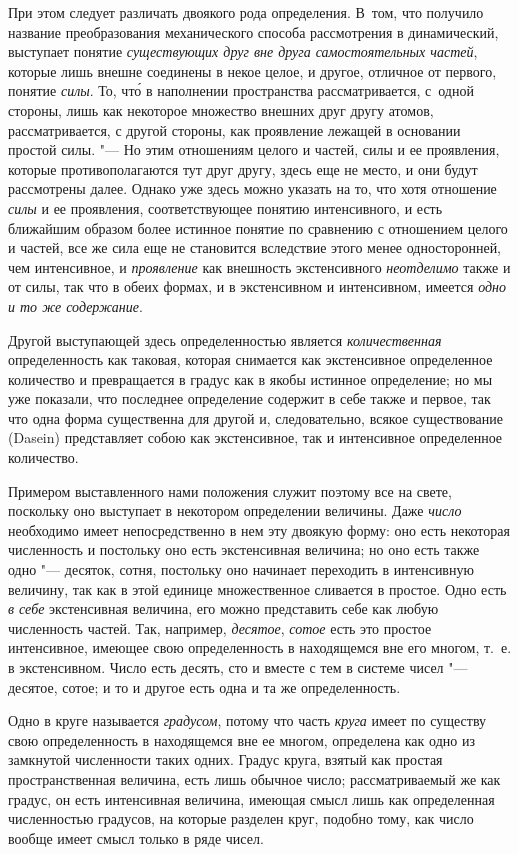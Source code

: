 При этом следует различать двоякого рода определения. В~том, что получило
название преобразования механического способа рассмотрения в динамический,
выступает понятие {\em существующих друг вне друга самостоятельных частей},
которые лишь внешне соединены в некое целое, и другое, отличное от первого,
понятие {\em силы}. То, чт\'{о} в наполнении пространства рассматривается,
с~одной стороны, лишь как некоторое множество внешних друг другу атомов,
рассматривается, с другой стороны, как проявление лежащей в основании простой
силы. "--- Но этим отношениям целого и частей, силы и ее проявления, которые
противополагаются тут друг другу, здесь еще не место, и они будут рассмотрены
далее. Однако уже здесь можно указать на то, что хотя отношение {\em силы} и ее
проявления, соответствующее понятию интенсивного, и есть ближайшим образом
более истинное понятие по сравнению с отношением целого и частей, все же сила
еще не становится вследствие этого менее односторонней, чем интенсивное, и
{\em проявление} как внешность экстенсивного {\em неотделимо} также и от силы,
так что в обеих формах, и в экстенсивном и интенсивном, имеется
{\em одно и то же содержание}.

Другой выступающей здесь определенностью является {\em количественная}
определенность как таковая, которая снимается как экстенсивное определенное
количество и превращается в градус как в якобы истинное определение; но мы уже
показали, что последнее определение содержит в себе также и первое, так что
одна форма существенна для другой и, следовательно, всякое существование
(Da\-sein) представляет собою как экстенсивное, так и интенсивное определенное
количество.

Примером выставленного нами положения служит поэтому все на свете, поскольку
оно выступает в некотором определении величины. Даже {\em число} необходимо
имеет непосредственно в нем эту двоякую форму: оно есть некоторая численность и
постольку оно есть экстенсивная величина; но оно есть также одно "--- десяток,
сотня, постольку оно начинает переходить в интенсивную величину, так как в этой
единице множественное сливается в простое. Одно есть {\em в себе} экстенсивная
величина, его можно представить себе как любую численность частей. Так,
например, {\em десятое}, {\em сотое} есть это простое интенсивное, имеющее свою
определенность в находящемся вне его многом, т.~е. в экстенсивном. Число есть
десять, сто и вместе с тем в системе чисел "--- десятое, сотое; и то и другое
есть одна и та же определенность.

Одно в круге называется {\em градусом}, потому что часть {\em круга} имеет по
существу свою определенность в находящемся вне ее многом, определена как одно
из замкнутой численности таких одних. Градус круга, взятый как простая
пространственная величина, есть лишь обычное число; рассматриваемый же как
градус, он есть интенсивная величина, имеющая смысл лишь как определенная
численностью градусов, на которые разделен круг, подобно тому, как число вообще
имеет смысл только в ряде чисел.


